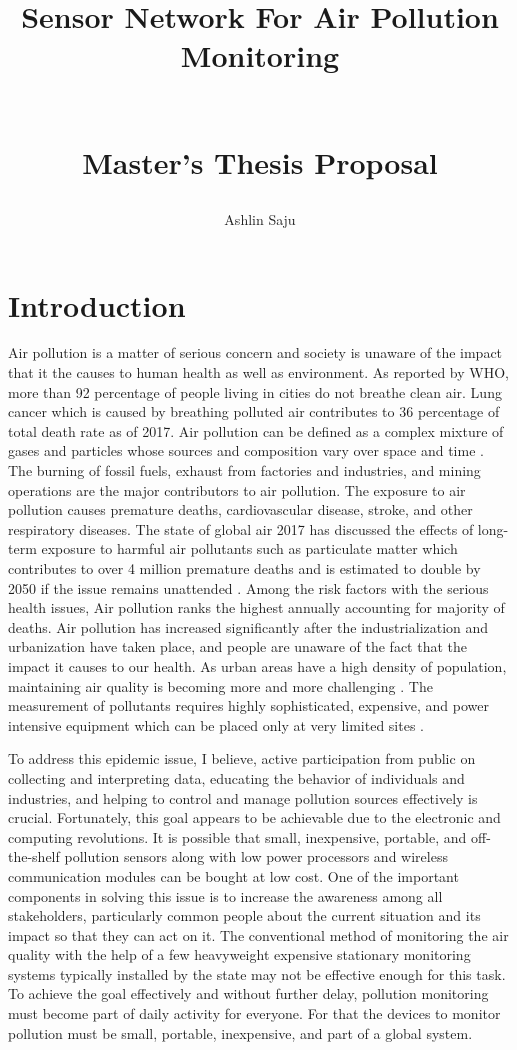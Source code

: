 \documentclass[11pt]{article}
\title{\begin{Large}
\textbf{Sensor Network For Air Pollution Monitoring}
\end{Large}\\ Master's Thesis Proposal}
\author{Ashlin Saju}
\date{}
\begin{document}
\maketitle
\newpage
\tableofcontents
\newpage

\section{Introduction}

Air pollution is a matter of serious concern and society is unaware of the impact that it the causes to human health as well as environment. As reported by WHO, more than 92 percentage of people living in cities do not breathe clean air. Lung cancer which is caused by breathing polluted air contributes to 36 percentage of total death rate as of 2017.
Air pollution can be defined as a complex mixture of gases and particles whose sources and composition vary over space and time \cite{HealthEffectsInstitute2017}. The burning of fossil fuels, exhaust from factories and industries, and mining operations are the major contributors to air pollution. The exposure to air pollution causes premature deaths, cardiovascular disease, stroke, and other respiratory diseases. The state of global air 2017 has discussed the effects of long-term exposure to harmful air pollutants such as particulate matter which contributes to over 4 million premature deaths and is estimated to double by 2050 if the issue remains unattended \cite{HealthEffectsInstitute2017}. Among the risk factors with the serious health issues, Air pollution ranks the highest annually accounting for majority of deaths. Air pollution has increased significantly after the industrialization and urbanization have taken place, and people are unaware of the fact that the impact it causes to our health. As urban areas have a high density of population, maintaining air quality is becoming more and more challenging  \cite{DCRMG17}. The measurement of pollutants requires highly sophisticated, expensive, and power intensive equipment which can be placed only at very limited sites \cite{PXMOC14}.
					
					To address this epidemic issue, I believe, active participation from public on collecting and interpreting data, educating the behavior of individuals and industries, and helping to control and manage pollution sources effectively is crucial. Fortunately, this goal appears to be achievable due to the electronic and computing revolutions. It is possible that small, inexpensive, portable, and off-the-shelf pollution sensors along with low power processors and wireless communication modules can be bought at low cost. One of the important components in solving this issue is to increase the awareness among all stakeholders, particularly common people about the current situation and its impact so that they can act on it. The conventional method of monitoring the air quality with the help of a few heavyweight expensive stationary monitoring systems typically installed by the state may not be effective enough for this task. To achieve the goal effectively and without further delay, pollution monitoring must become part of daily activity for everyone. For that the devices to monitor pollution must be small, portable, inexpensive, and part of a global system.
 
\end{document}
